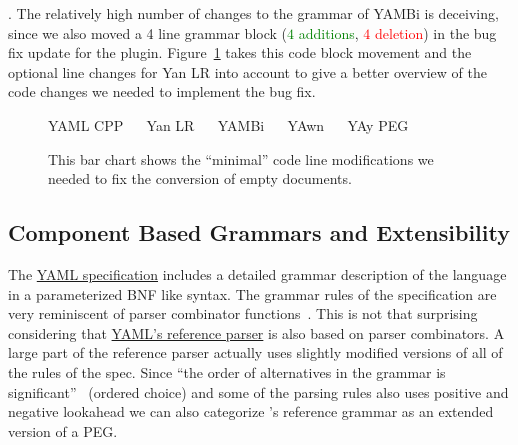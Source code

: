 . The relatively high number of changes to the grammar of YAMBi is deceiving, since we also moved a 4 line grammar block (\textcolor{Green}{$4$ additions}, \textcolor{Red}{$4$ deletion}) in the bug fix update for the plugin. Figure~\ref{fig:empty_document_minimum_count} takes this code block movement and the optional line changes for Yan LR into account to give a better overview of the code changes we needed to implement the bug fix.

\begin{figure}[H]
  \begin{bchart}[max=20, width=0.8\textwidth, unit={~Lines of Code}]
  \end{bchart}
  \begin{center}
  \vspace{-0.5cm}
     YAML CPP ~~
     Yan LR ~~
     YAMBi ~~
     YAwn ~~
     YAy PEG
  \vspace{-0.5cm}
  \end{center}
  \caption{This bar chart shows the “minimal” code line modifications we needed to fix the conversion of empty documents.}
  \label{fig:empty_document_minimum_count}
\end{figure}

\subsection{Component Based Grammars and Extensibility}

The \href{http://yaml.org/spec/1.2/spec}{YAML specification} includes a detailed grammar description of the language in a parameterized \gls{BNF} like syntax. The grammar rules of the specification are very reminiscent of parser combinator functions~\cite{hutton1992higher, hutton1996monadic}. This is not that surprising considering that \href{https://hackage.haskell.org/package/YamlReference}{YAML’s reference parser} is also based on parser combinators. A large part of the reference parser actually uses slightly modified versions of all of the rules of the  spec. Since “the order of alternatives in the grammar is significant”~\cite{ben2009yaml} (ordered choice) and some of the parsing rules also uses positive and negative lookahead we can also categorize ’s reference grammar as an extended version of a \gls{PEG}.

